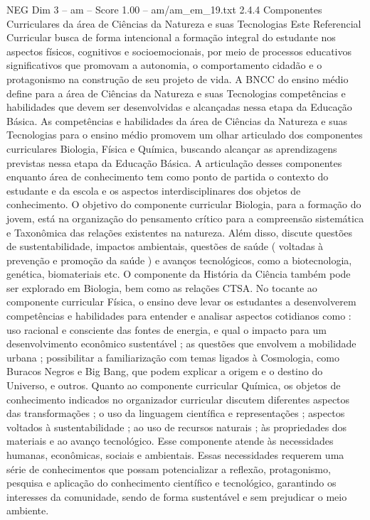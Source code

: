 \begin{textsample}{NEG Dim 3 – am – Score 1.00 – am/am\_em\_19.txt}  \label{ex:f3_neg_252}
2.4.4 Componentes Curriculares da área de Ciências da Natureza e suas Tecnologias Este Referencial Curricular busca de forma intencional a formação integral do estudante nos aspectos físicos, cognitivos e socioemocionais, por meio de processos educativos significativos que promovam a autonomia, o comportamento cidadão e o protagonismo na construção de seu projeto de vida.
A BNCC do ensino médio define para a área de Ciências da Natureza e suas Tecnologias competências e habilidades que devem ser desenvolvidas e alcançadas nessa etapa da Educação Básica.
As competências e habilidades da área de Ciências da Natureza e suas Tecnologias para o ensino médio promovem um olhar articulado dos componentes curriculares Biologia, Física e Química, buscando alcançar as aprendizagens previstas nessa etapa da Educação Básica.
A articulação desses componentes enquanto área de conhecimento tem como ponto de partida o contexto do estudante e da escola e os aspectos interdisciplinares dos objetos de conhecimento.
O objetivo do componente curricular Biologia, para a formação do jovem, está na organização do pensamento crítico para a compreensão sistemática e Taxonômica das relações existentes na natureza.
Além disso, discute questões de sustentabilidade, impactos ambientais, questões de saúde ( voltadas à prevenção e promoção da saúde ) e avanços tecnológicos, como a biotecnologia, genética, biomateriais etc.
O componente da História da Ciência também pode ser explorado em Biologia, bem como as relações CTSA.
No tocante ao componente curricular Física, o ensino deve levar os estudantes a desenvolverem competências e habilidades para entender e analisar aspectos cotidianos como : uso racional e consciente das fontes de energia, e qual o impacto para um desenvolvimento econômico sustentável ; as questões que envolvem a mobilidade urbana ; possibilitar a familiarização com temas ligados à Cosmologia, como Buracos Negros e Big Bang, que podem explicar a origem e o destino do Universo, e outros.
Quanto ao componente curricular Química, os objetos de conhecimento indicados no organizador curricular discutem diferentes aspectos das transformações ; o uso da linguagem científica e representações ; aspectos voltados à sustentabilidade ; ao uso de recursos naturais ; às propriedades dos materiais e ao avanço tecnológico.
Esse componente atende às necessidades humanas, econômicas, sociais e ambientais.
Essas necessidades requerem uma série de conhecimentos que possam potencializar a reflexão, protagonismo, pesquisa e aplicação do conhecimento científico e tecnológico, garantindo os interesses da comunidade, sendo de forma sustentável e sem prejudicar o meio ambiente.

\end{textsample}
